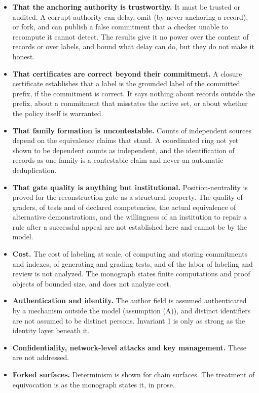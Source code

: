 \documentclass[11pt]{article}
\theoremstyle{plain}
\theoremstyle{definition}
\theoremstyle{remark}
\begin{document}
\begin{itemize}[nosep]
\item \textbf{That the anchoring authority is trustworthy.} It must be trusted or audited. A corrupt authority can delay, omit (by never anchoring a record), or fork, and can publish a false commitment that a checker unable to recompute it cannot detect. The results give it no power over the content of records or over labels, and bound what delay can do, but they do not make it honest.
\item \textbf{That certificates are correct beyond their commitment.} A closure certificate establishes that a label is the grounded label of the committed prefix, if the commitment is correct. It says nothing about records outside the prefix, about a commitment that misstates the active set, or about whether the policy itself is warranted.
\item \textbf{That family formation is uncontestable.} Counts of independent sources depend on the equivalence claims that stand. A coordinated ring not yet shown to be dependent counts as independent, and the identification of records as one family is a contestable claim and never an automatic deduplication.
\item \textbf{That gate quality is anything but institutional.} Position-neutrality is proved for the reconstruction gate as a structural property. The quality of graders, of tests and of declared competencies, the actual equivalence of alternative demonstrations, and the willingness of an institution to repair a rule after a successful appeal are not established here and cannot be by the model.
\item \textbf{Cost.} The cost of labeling at scale, of computing and storing commitments and indexes, of generating and grading tests, and of the labor of labeling and review is not analyzed. The monograph states finite computations and proof objects of bounded size, and does not analyze cost.
\item \textbf{Authentication and identity.} The author field is assumed authenticated by a mechanism outside the model (assumption (A)), and distinct identifiers are not assumed to be distinct persons. Invariant 1 is only as strong as the identity layer beneath it.
\item \textbf{Confidentiality, network-level attacks and key management.} These are not addressed.
\item \textbf{Forked surfaces.} Determinism is shown for chain surfaces. The treatment of equivocation is as the monograph states it, in prose.

\end{itemize}
\end{document}
